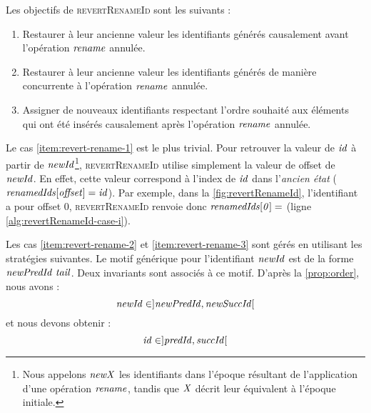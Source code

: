 Les objectifs de \textsc{revertRenameId} sont les suivants :
\begin{enumerate}
  \item \label{item:revert-rename-1}
    Restaurer à leur ancienne valeur les identifiants générés causalement avant l'opération $\mathit{rename}$ annulée.
  \item \label{item:revert-rename-2}
    Restaurer à leur ancienne valeur les identifiants générés de manière concurrente à l'opération $\mathit{rename}$ annulée.
  \item \label{item:revert-rename-3}
    Assigner de nouveaux identifiants respectant l'ordre souhaité aux éléments qui ont été insérés causalement après l'opération $\mathit{rename}$ annulée.
\end{enumerate}

Le cas \ref{item:revert-rename-1} est le plus trivial.
Pour retrouver la valeur de $\mathit{id}$ à partir de $\mathit{newId}$\footnote{Nous appelons $\mathit{newX}$ les identifiants dans l'époque résultant de l'application d'une opération $\mathit{rename}$, tandis que $\mathit{X}$ décrit leur équivalent à l'époque initiale.}, \textsc{revertRenameId} utilise simplement la valeur de offset de $\mathit{newId}$.
En effet, cette valeur correspond à l'index de $\mathit{id}$ dans l'\emph{ancien état} (\ie $\mathit{renamedIds[offset]} = \mathit{id}$).
Par exemple, dans la \autoref{fig:revertRenameId}, l'identifiant  a pour offset 0, \textsc{revertRenameId} renvoie donc $\mathit{renamedIds[0]} =$  (ligne \ref{alg:revertRenameId-case-i}).

Les cas \ref{item:revert-rename-2} et \ref{item:revert-rename-3} sont gérés en utilisant les stratégies suivantes.
Le motif générique pour l'identifiant $\mathit{newId}$ est de la forme $\mathit{newPredId~tail}$.
Deux invariants sont associés à ce motif.
D'après la \autoref{prop:order}, nous avons :
\[\mathit{newId} \in ]\mathit{newPredId}, \mathit{newSuccId}[\]
et nous devons obtenir :
\[\mathit{id} \in ]\mathit{predId}, \mathit{succId}[\]

